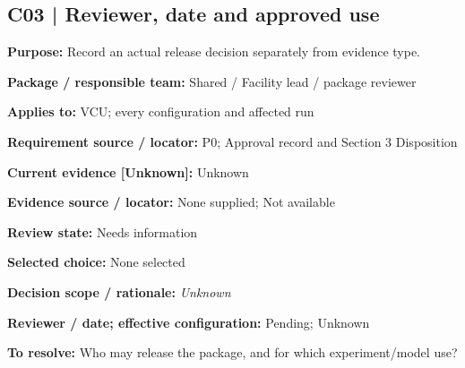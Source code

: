 \documentclass[11pt]{article}
\begin{document}
\par\noindent\begin{minipage}{\textwidth}\small\setlength{\parskip}{2pt}
\subsection*{C03 | Reviewer, date and approved use}
\textbf{Purpose:} Record an actual release decision separately from evidence type.\par
\textbf{Package / responsible team:} Shared / Facility lead / package reviewer\par
\textbf{Applies to:} VCU; every configuration and affected run\par
\textbf{Requirement source / locator:} P0; Approval record and Section 3 Disposition\par
\textbf{Current evidence [Unknown]:} Unknown\par
\textbf{Evidence source / locator:} None supplied; Not available\par
\textbf{Review state:} Needs information\par
\textbf{Selected choice:} None selected\par
\textbf{Decision scope / rationale:} \textit{Unknown}\par
\textbf{Reviewer / date; effective configuration:} Pending; Unknown\par
\textbf{To resolve:} Who may release the package, and for which experiment/model use?\par
\end{minipage}\par\vspace{5pt}
\end{document}
